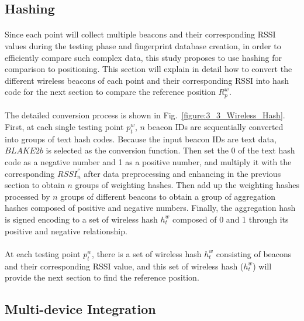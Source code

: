 \documentclass[a4paper,12pt]{report}
\begin{document}
\subsection{Hashing}

\paragraph{}
Since each point will collect multiple beacons and their corresponding RSSI values during the testing phase and fingerprint database creation, in order to efficiently compare such complex data, this study proposes to use hashing for comparison to positioning. This section will explain in detail how to convert the different wireless beacons of each point and their corresponding RSSI into hash code for the next section to compare the reference position $R_p^{w}$.
%

\paragraph{}
The detailed conversion process is shown in Fig.~\ref{figure:3_3_Wireless_Hash}. First, at each single testing point $p_t^w$, $n$ beacon IDs are sequentially converted into groups of text hash codes. Because the input beacon IDs are text data, $BLAKE2b$ \cite{Aumasson2013BLAKE2} is selected as the conversion function. Then set the 0 of the text hash code as a negative number and 1 as a positive number, and multiply it with the corresponding $RSSI_n^{''}$ after data preprocessing and enhancing in the previous section to obtain $n$ groups of weighting hashes. Then add up the weighting hashes processed by $n$ groups of different beacons to obtain a group of aggregation hashes composed of positive and negative numbers. Finally, the aggregation hash is signed encoding to a set of wireless hash $h_t^{w}$ composed of 0 and 1 through its positive and negative relationship.
%

\paragraph{}
At each testing point $p_t^w$, there is a set of wireless hash $h_t^{w}$ consisting of beacons and their corresponding RSSI value, and this set of wireless hash ($h_t^{w}$) will provide the next section to find the reference position.
%

\subsection{Multi-device Integration}
\end{document}
